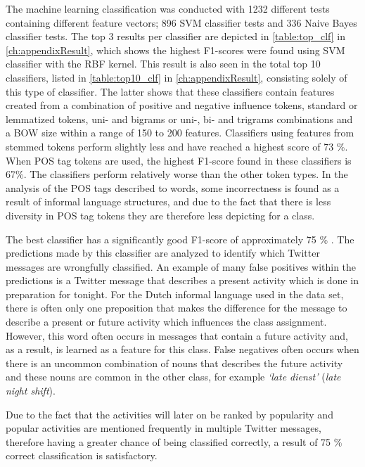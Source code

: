 The machine learning classification was conducted with 1232 different tests containing different feature vectors; 896 SVM classifier tests and 336 Naive Bayes classifier tests. The top 3 results per classifier are depicted in \autoref{table:top_clf} in \autoref{ch:appendixResult}, which shows the highest F1-scores were found using SVM classifier with the RBF kernel. This result is also seen in the total top 10 classifiers, listed in \autoref{table:top10_clf} in \autoref{ch:appendixResult}, consisting solely of this type of classifier. The latter shows that these classifiers contain features created from a combination of positive and negative influence tokens, standard or lemmatized tokens, uni- and bigrams or uni-, bi- and trigrams combinations and a BOW size within a range of 150 to 200 features. Classifiers using features from stemmed tokens perform slightly less and have reached a highest score of 73 \%. When POS tag tokens are used, the highest F1-score found in these classifiers is 67\%. The classifiers perform relatively worse than the other token types. In the analysis of the POS tags described to words, some incorrectness is found as a result of informal language structures, and due to the fact that there is less diversity in POS tag tokens they are therefore less depicting for a class. 

The best classifier has a significantly good F1-score of approximately 75 \% . The predictions made by this classifier are analyzed to identify which Twitter messages are wrongfully classified. An example of many false positives within the predictions is a Twitter message that describes a present activity which is done in preparation for tonight. For the Dutch informal language used in the data set, there is often only one preposition that makes the difference for the message to describe a present or future activity which influences the class assignment. However, this word often occurs in messages that contain a future activity and, as a result, is learned as a feature for this class. False negatives often occurs when there is an uncommon combination of nouns that describes the future activity and these nouns are common in the other class, for example \textit{`late dienst'} (\textit{late night shift}). 

Due to the fact that the activities will later on be ranked by popularity and popular activities are mentioned frequently in multiple Twitter messages, therefore having a greater chance of being classified correctly, a result of 75 \% correct classification is satisfactory. 

